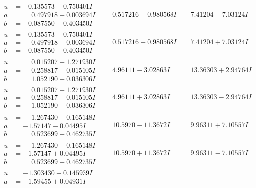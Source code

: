\documentclass[1p]{elsarticle_modified}
\theoremstyle{definition}
\begin{document}
$$\begin{array}{c|c|c}
\begin{aligned}
u &= -0.135573 + 0.750401 I \\
a &= \phantom{-}0.497918 + 0.003694 I \\
b &= -0.087550 - 0.403450 I\end{aligned}
 & \phantom{-}0.517216 + 0.980568 I & \phantom{-}7.41204 - 7.03124 I \\ \hline\begin{aligned}
u &= -0.135573 - 0.750401 I \\
a &= \phantom{-}0.497918 - 0.003694 I \\
b &= -0.087550 + 0.403450 I\end{aligned}
 & \phantom{-}0.517216 - 0.980568 I & \phantom{-}7.41204 + 7.03124 I \\ \hline\begin{aligned}
u &= \phantom{-}0.015207 + 1.271930 I \\
a &= \phantom{-}0.258817 + 0.015105 I \\
b &= \phantom{-}1.052190 - 0.036306 I\end{aligned}
 & \phantom{-}4.96111 - 3.02863 I & \phantom{-}13.36303 + 2.94764 I \\ \hline\begin{aligned}
u &= \phantom{-}0.015207 - 1.271930 I \\
a &= \phantom{-}0.258817 - 0.015105 I \\
b &= \phantom{-}1.052190 + 0.036306 I\end{aligned}
 & \phantom{-}4.96111 + 3.02863 I & \phantom{-}13.36303 - 2.94764 I \\ \hline\begin{aligned}
u &= \phantom{-}1.267430 + 0.165148 I \\
a &= -1.57147 - 0.04495 I \\
b &= \phantom{-}0.523699 + 0.462735 I\end{aligned}
 & \phantom{-}10.5970 - 11.3672 I & \phantom{-}9.96311 + 7.10557 I \\ \hline\begin{aligned}
u &= \phantom{-}1.267430 - 0.165148 I \\
a &= -1.57147 + 0.04495 I \\
b &= \phantom{-}0.523699 - 0.462735 I\end{aligned}
 & \phantom{-}10.5970 + 11.3672 I & \phantom{-}9.96311 - 7.10557 I \\ \hline\begin{aligned}
u &= -1.303430 + 0.145939 I \\
a &= -1.59455 + 0.04931 I \\

\end{aligned}
\end{array}$$
\end{document}
